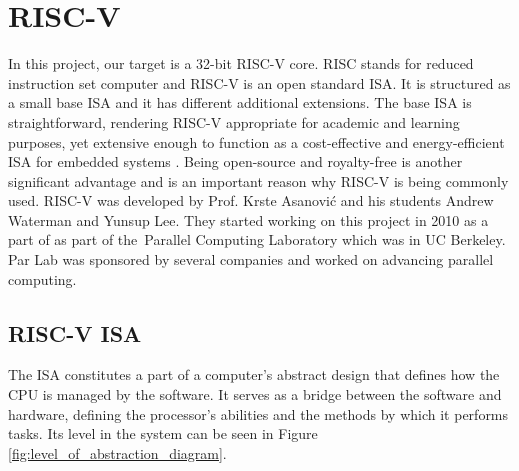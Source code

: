 \clearpage
\chapter{RISC-V}\label{ch:riscv}
In this project, our target is a 32-bit RISC-V core. RISC stands for reduced instruction set computer and RISC-V is an open standard ISA. \cite{riscvorgabout} It is structured as a small base ISA and it has different additional extensions. The base ISA is straightforward, rendering RISC-V appropriate for academic and learning purposes, yet extensive enough to function as a cost-effective and energy-efficient ISA for embedded systems \cite{watermanriscv}. Being open-source and royalty-free is another significant advantage and is an important reason why RISC-V is being commonly used. 
RISC-V was developed by Prof. Krste Asanović and his students Andrew Waterman and Yunsup Lee. They started working on this project in 2010 as a part of as part of the Parallel Computing Laboratory which was in UC Berkeley. Par Lab was sponsored by several companies and worked on advancing parallel computing.

\section{RISC-V ISA}
The ISA constitutes a part of a computer’s abstract design that defines how the CPU is managed by the software. It serves as a bridge between the software and hardware, defining the processor’s abilities and the methods by which it performs tasks. Its level in the system can be seen in Figure \ref{fig:level_of_abstraction_diagram}.

